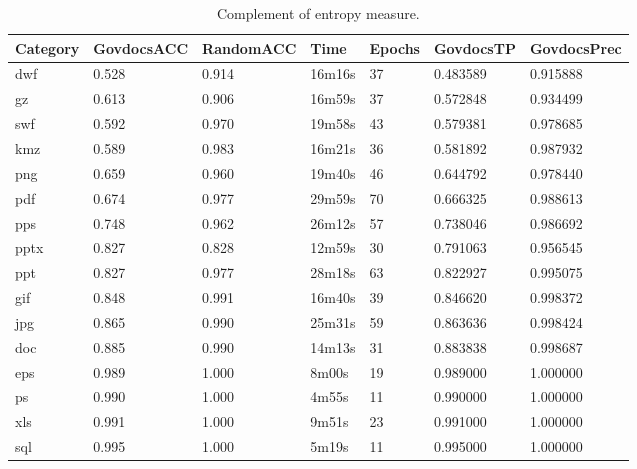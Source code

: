\begin{table}[!ht]
    \centering
    \caption[Complement of entropy measure]{Complement of entropy measure.}
    \label{tab:pass1}
\begin{tabular}{|l|l|l|l|l|l|l|}
\hline
Category & GovdocsACC & RandomACC & Time   & Epochs & GovdocsTP & GovdocsPrec \\ \hline
dwf      & 0.528           & 0.914          & 16m16s & 37     & 0.483589  & 0.915888         \\ \hline
gz       & 0.613           & 0.906          & 16m59s & 37     & 0.572848  & 0.934499         \\ \hline
swf      & 0.592           & 0.970          & 19m58s & 43     & 0.579381  & 0.978685         \\ \hline
kmz      & 0.589           & 0.983          & 16m21s & 36     & 0.581892  & 0.987932         \\ \hline
png      & 0.659           & 0.960          & 19m40s & 46     & 0.644792  & 0.978440         \\ \hline
pdf      & 0.674           & 0.977          & 29m59s & 70     & 0.666325  & 0.988613         \\ \hline
pps      & 0.748           & 0.962          & 26m12s & 57     & 0.738046  & 0.986692         \\ \hline
pptx     & 0.827           & 0.828          & 12m59s & 30     & 0.791063  & 0.956545         \\ \hline
ppt      & 0.827           & 0.977          & 28m18s & 63     & 0.822927  & 0.995075         \\ \hline
gif      & 0.848           & 0.991          & 16m40s & 39     & 0.846620  & 0.998372         \\ \hline
jpg      & 0.865           & 0.990          & 25m31s & 59     & 0.863636  & 0.998424         \\ \hline
doc      & 0.885           & 0.990          & 14m13s & 31     & 0.883838  & 0.998687         \\ \hline
eps      & 0.989           & 1.000          & 8m00s  & 19     & 0.989000  & 1.000000         \\ \hline
ps       & 0.990           & 1.000          & 4m55s  & 11     & 0.990000  & 1.000000         \\ \hline
xls      & 0.991           & 1.000          & 9m51s  & 23     & 0.991000  & 1.000000         \\ \hline
sql      & 0.995           & 1.000          & 5m19s  & 11     & 0.995000  & 1.000000         \\ \hline

\end{tabular}
\end{table}
